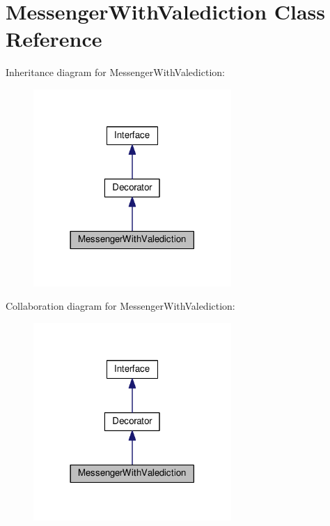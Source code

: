 \hypertarget{classMessengerWithValediction}{}\section{Messenger\+With\+Valediction Class Reference}
\label{classMessengerWithValediction}


Inheritance diagram for Messenger\+With\+Valediction\+:
\nopagebreak
\begin{figure}[H]
\begin{center}
\leavevmode
\includegraphics[width=213pt]{classMessengerWithValediction__inherit__graph}
\end{center}
\end{figure}


Collaboration diagram for Messenger\+With\+Valediction\+:
\nopagebreak
\begin{figure}[H]
\begin{center}
\leavevmode
\includegraphics[width=213pt]{classMessengerWithValediction__coll__graph}
\end{center}
\end{figure}

